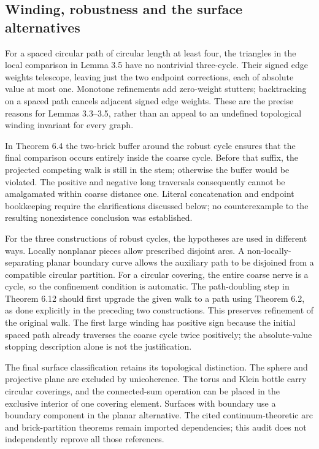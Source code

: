 \documentclass[10pt]{article}
\begin{document}
\subsection*{Winding, robustness and the surface alternatives}
For a spaced circular path of circular length at least four, the triangles in the local comparison in Lemma 3.5 have no nontrivial three-cycle. Their signed edge weights telescope, leaving just the two endpoint corrections, each of absolute value at most one. Monotone refinements add zero-weight stutters; backtracking on a spaced path cancels adjacent signed edge weights. These are the precise reasons for Lemmas 3.3–3.5, rather than an appeal to an undefined topological winding invariant for every graph.\par
In Theorem 6.4 the two-brick buffer around the robust cycle ensures that the final comparison occurs entirely inside the coarse cycle. Before that suffix, the projected competing walk is still in the stem; otherwise the buffer would be violated. The positive and negative long traversals consequently cannot be amalgamated within coarse distance one. Literal concatenation and endpoint bookkeeping require the clarifications discussed below; no counterexample to the resulting nonexistence conclusion was established.\par
For the three constructions of robust cycles, the hypotheses are used in different ways. Locally nonplanar pieces allow prescribed disjoint arcs. A non-locally-separating planar boundary curve allows the auxiliary path to be disjoined from a compatible circular partition. For a circular covering, the entire coarse nerve is a cycle, so the confinement condition is automatic. The path-doubling step in Theorem 6.12 should first upgrade the given walk to a path using Theorem 6.2, as done explicitly in the preceding two constructions. This preserves refinement of the original walk. The first large winding has positive sign because the initial spaced path already traverses the coarse cycle twice positively; the absolute-value stopping description alone is not the justification.\par
The final surface classification retains its topological distinction. The sphere and projective plane are excluded by unicoherence. The torus and Klein bottle carry circular coverings, and the connected-sum operation can be placed in the exclusive interior of one covering element. Surfaces with boundary use a boundary component in the planar alternative. The cited continuum-theoretic arc and brick-partition theorems remain imported dependencies; this audit does not independently reprove all those references.\par
\end{document}
